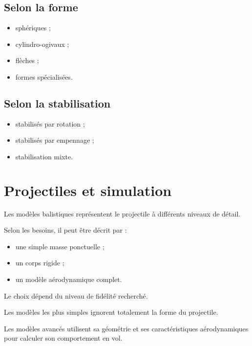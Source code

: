 \subsection{Selon la forme}

\begin{itemize}
    \item sphériques ;
    \item cylindro-ogivaux ;
    \item flèches ;
    \item formes spécialisées.
\end{itemize}

\subsection{Selon la stabilisation}

\begin{itemize}
    \item stabilisés par rotation ;
    \item stabilisés par empennage ;
    \item stabilisation mixte.
\end{itemize}

\section{Projectiles et simulation}

Les modèles balistiques représentent le projectile à différents niveaux de
détail.

Selon les besoins, il peut être décrit par :

\begin{itemize}
    \item une simple masse ponctuelle ;
    \item un corps rigide ;
    \item un modèle aérodynamique complet.
\end{itemize}

Le choix dépend du niveau de fidélité recherché.

\begin{simulation}

Les modèles les plus simples ignorent totalement la forme du projectile.

Les modèles avancés utilisent sa géométrie et ses caractéristiques
aérodynamiques pour calculer son comportement en vol.

\end{simulation}

